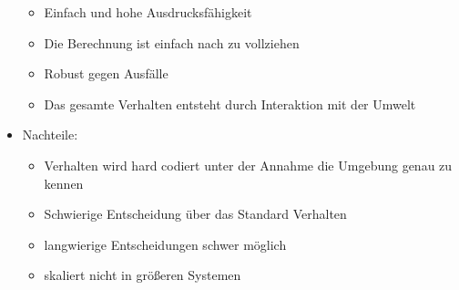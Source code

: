 \documentclass{article} %
\begin{document}
\begin{itemize}
		\begin{itemize}
			\item Einfach und hohe Ausdrucksfähigkeit
			\item Die Berechnung ist einfach nach zu vollziehen
			\item Robust gegen Ausfälle
			\item Das gesamte Verhalten entsteht durch Interaktion mit der Umwelt
		\end{itemize}
		\item Nachteile:
		\begin{itemize}
			\item Verhalten wird hard codiert unter der Annahme die Umgebung genau zu kennen
			\item Schwierige Entscheidung über das Standard Verhalten
			\item langwierige Entscheidungen schwer möglich
			\item skaliert nicht in größeren Systemen
		\end{itemize}
	\end{itemize}
\end{document}
